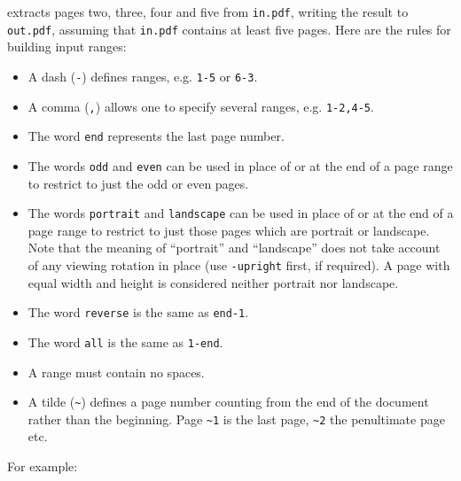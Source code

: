 \documentclass{book}
\begin{document}
  \noindent extracts pages two, three, four and five from \texttt{in.pdf},
writing the result to \texttt{out.pdf}, assuming that \texttt{in.pdf} contains
at least five pages.
  Here are the rules for building input ranges:
  \begin{itemize}
    \item A dash (\texttt{-}) defines ranges, e.g. \texttt{1-5} or \texttt{6-3}.
    \item A comma (\texttt{,}) allows one to specify several ranges, e.g. \texttt{1-2,4-5}.
    \item The word \texttt{end} represents the last page number.
    \item The words \texttt{odd} and \texttt{even} can be used in place of or at the end of a page range to restrict to just the odd or even pages.
    \item The words \texttt{portrait} and \texttt{landscape} can be used in place of or at the end of a page range to restrict to just those pages which are portrait or landscape. Note that the meaning of ``portrait'' and ``landscape'' does not take account of any viewing rotation in place (use \texttt{-upright} first, if required). A page with equal width and height is considered neither portrait nor landscape.
    \item The word \texttt{reverse} is the same as \texttt{end-1}.
    \item The word \texttt{all} is the same as \texttt{1-end}.
    \item A range must contain no spaces.
    \item A tilde (\texttt{\~{}}) defines a page number counting from the end of the document rather than the beginning. Page \texttt{\~{}1} is the last page, \texttt{\~{}2} the penultimate page etc.
  \end{itemize}
 
  \noindent For example:
\end{document}
